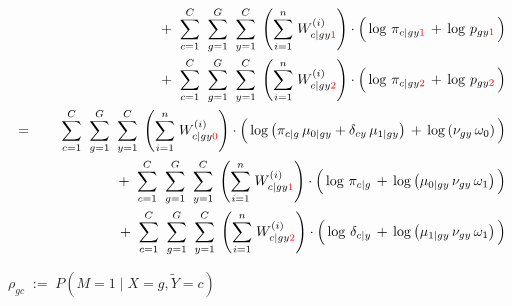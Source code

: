 \begin{eqnarray*}
&&
	+ \;\;
	\overset{C}{\underset{c=1}{\sum}}\;\;
	\overset{G}{\underset{g=1}{\sum}}\;\;
	\overset{C}{\underset{y=1}{\sum}}\;
	\left(\overset{n}{\underset{i=1}{\sum}}\;W^{(i)}_{c \vert gy{\color{red}1}}\right)
	\cdot
	\left(\,
		\log\,\pi_{c \vert gy\color{red}1} \,\overset{{\color{white}.}}{+}\, \log\,p_{gy\color{red}1}
	\,\right)
\\
&&
	+ \;\;
	\overset{C}{\underset{c=1}{\sum}}\;\;
	\overset{G}{\underset{g=1}{\sum}}\;\;
	\overset{C}{\underset{y=1}{\sum}}\;
	\left(\overset{n}{\underset{i=1}{\sum}}\;W^{(i)}_{c \vert gy{\color{red}2}}\right)
	\cdot
	\left(\,
		\log\,\pi_{c \vert gy\color{red}2} \,\overset{{\color{white}.}}{+}\, \log\,p_{gy\color{red}2}
	\,\right)
\\
&=&
	{\color{white}+} \;\;
	\overset{C}{\underset{c=1}{\sum}}\;\;
	\overset{G}{\underset{g=1}{\sum}}\;\;
	\overset{C}{\underset{y=1}{\sum}}\;
	\left(\overset{n}{\underset{i=1}{\sum}}\;W^{(i)}_{c \vert gy{\color{red}0}}\right)
	\cdot
	\left(\,
		\log\left(\pi_{c \vert g}\,\mu_{0 \vert gy} + \delta_{cy}\,\mu_{1\vert gy}\right)
		\,\overset{{\color{white}.}}{+}\,
		\log\left(\nu_{gy}\,\omega_{0}\right)
	\,\right)
\\
&&
	+ \;\;
	\overset{C}{\underset{c=1}{\sum}}\;\;
	\overset{G}{\underset{g=1}{\sum}}\;\;
	\overset{C}{\underset{y=1}{\sum}}\;
	\left(\overset{n}{\underset{i=1}{\sum}}\;W^{(i)}_{c \vert gy{\color{red}1}}\right)
	\cdot
	\left(\,
		\log\,\pi_{c \vert g}
		\,\overset{{\color{white}.}}{+}\,
		\log\left(\mu_{0\vert gy}\,\nu_{gy}\,\omega_{1}\right)
	\,\right)
\\
&&
	+ \;\;
	\overset{C}{\underset{c=1}{\sum}}\;\;
	\overset{G}{\underset{g=1}{\sum}}\;\;
	\overset{C}{\underset{y=1}{\sum}}\;
	\left(\overset{n}{\underset{i=1}{\sum}}\;W^{(i)}_{c \vert gy{\color{red}2}}\right)
	\cdot
	\left(\,
		\log\,\delta_{c \vert y}
		\,\overset{{\color{white}.}}{+}\,
		\log\left(\mu_{1 \vert gy}\,\nu_{gy}\,\omega_{1}\right)
	\,\right)
\end{eqnarray*}

$\rho_{gc} \;:=\; P\!\left(M=1\;\vert\;X=g,\widetilde{Y}=c\right)$

